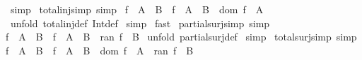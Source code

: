 \begin{isabellebody}
\isamarkupfalse%
\ simp\isanewline
{}\isamarkupfalse%
%
\endisatagproof
{\isafoldproof}%
%
\isadelimproof
\isanewline
%
\endisadelimproof
\isanewline
{}\isamarkupfalse%
\ total{\isacharunderscore}inj{\isacharunderscore}simp\ {\isacharbrackleft}simp{\isacharbrackright}{\isacharcolon}\ \isanewline
{\isachardoublequoteopen}{\isacharparenleft}f\ {\isacharcolon}\ {\isacharparenleft}A\ {\isachargreater}{\isacharminus}{\isacharminus}{\isachargreater}\ B{\isacharparenright}{\isacharparenright}\ {\isacharequal}\ {\isacharparenleft}f\ {\isacharcolon}\ {\isacharparenleft}A\ {\isachargreater}{\isacharminus}{\isacharbar}{\isacharminus}{\isachargreater}\ B{\isacharparenright}\ {\isacharampersand}\ dom\ f\ {\isacharequal}\ A{\isacharparenright}{\isachardoublequoteclose}\isanewline
%
\isadelimproof
%
\endisadelimproof
%
\isatagproof
{}\isamarkupfalse%
\ {\isacharparenleft}unfold\ total{\isacharunderscore}inj{\isacharunderscore}def\ Int{\isacharunderscore}def{\isacharparenright}\isanewline
{}\isamarkupfalse%
\ simp\isanewline
{}\isamarkupfalse%
\ fast\isanewline
{}\isamarkupfalse%
%
\endisatagproof
{\isafoldproof}%
%
\isadelimproof
\isanewline
%
\endisadelimproof
\isanewline
{}\isamarkupfalse%
\ partial{\isacharunderscore}surj{\isacharunderscore}simp\ {\isacharbrackleft}simp{\isacharbrackright}{\isacharcolon}\ \isanewline
{\isachardoublequoteopen}{\isacharparenleft}f\ {\isacharcolon}\ {\isacharparenleft}A\ {\isacharminus}{\isacharbar}{\isacharminus}{\isachargreater}{\isachargreater}\ B{\isacharparenright}{\isacharparenright}\ {\isacharequal}\ {\isacharparenleft}f\ {\isacharcolon}\ {\isacharparenleft}A\ {\isacharminus}{\isacharbar}{\isacharminus}{\isachargreater}\ B{\isacharparenright}\ {\isacharampersand}\ ran\ f\ {\isacharequal}\ B{\isacharparenright}{\isachardoublequoteclose}\isanewline
%
\isadelimproof
%
\endisadelimproof
%
\isatagproof
{}\isamarkupfalse%
\ {\isacharparenleft}unfold\ partial{\isacharunderscore}surj{\isacharunderscore}def{\isacharparenright}\isanewline
{}\isamarkupfalse%
\ simp\isanewline
{}\isamarkupfalse%
%
\endisatagproof
{\isafoldproof}%
%
\isadelimproof
\isanewline
%
\endisadelimproof
\isanewline
{}\isamarkupfalse%
\ total{\isacharunderscore}surj{\isacharunderscore}simp\ {\isacharbrackleft}simp{\isacharbrackright}{\isacharcolon}\ \isanewline
{\isachardoublequoteopen}{\isacharparenleft}f\ {\isacharcolon}\ {\isacharparenleft}A\ {\isacharminus}{\isacharminus}{\isachargreater}{\isachargreater}\ B{\isacharparenright}{\isacharparenright}\ {\isacharequal}\ {\isacharparenleft}f\ {\isacharcolon}\ {\isacharparenleft}A\ {\isacharminus}{\isacharbar}{\isacharminus}{\isachargreater}\ B{\isacharparenright}\ {\isacharampersand}\ dom\ f\ {\isacharequal}\ A\ {\isacharampersand}\ ran\ f\ {\isacharequal}\ B{\isacharparenright}{\isachardoublequoteclose}\isanewline

\end{isabellebody}
